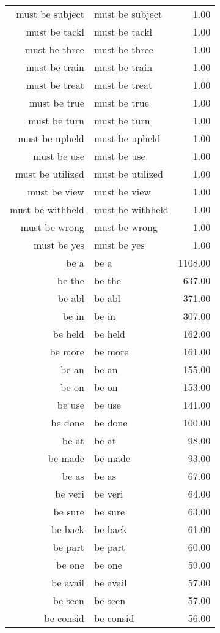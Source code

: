 \begin{table}[ht]
\begin{tabular}{rlr}
  must be subject & must be subject & 1.00 \\ 
  must be tackl & must be tackl & 1.00 \\ 
  must be three & must be three & 1.00 \\ 
  must be train & must be train & 1.00 \\ 
  must be treat & must be treat & 1.00 \\ 
  must be true & must be true & 1.00 \\ 
  must be turn & must be turn & 1.00 \\ 
  must be upheld & must be upheld & 1.00 \\ 
  must be use & must be use & 1.00 \\ 
  must be utilized & must be utilized & 1.00 \\ 
  must be view & must be view & 1.00 \\ 
  must be withheld & must be withheld & 1.00 \\ 
  must be wrong & must be wrong & 1.00 \\ 
  must be yes & must be yes & 1.00 \\ 
  be a & be a & 1108.00 \\ 
  be the & be the & 637.00 \\ 
  be abl & be abl & 371.00 \\ 
  be in & be in & 307.00 \\ 
  be held & be held & 162.00 \\ 
  be more & be more & 161.00 \\ 
  be an & be an & 155.00 \\ 
  be on & be on & 153.00 \\ 
  be use & be use & 141.00 \\ 
  be done & be done & 100.00 \\ 
  be at & be at & 98.00 \\ 
  be made & be made & 93.00 \\ 
  be as & be as & 67.00 \\ 
  be veri & be veri & 64.00 \\ 
  be sure & be sure & 63.00 \\ 
  be back & be back & 61.00 \\ 
  be part & be part & 60.00 \\ 
  be one & be one & 59.00 \\ 
  be avail & be avail & 57.00 \\ 
  be seen & be seen & 57.00 \\ 
  be consid & be consid & 56.00 \\ 

\end{tabular}
\end{table}
